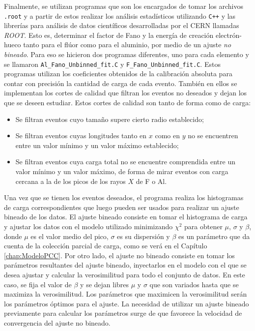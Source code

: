 Finalmente, se utilizan programas que son los encargados de tomar los archivos \verb|.root| y a partir de estos realizar los análisis estadísticos utilizando \verb|C++| y las librerías para análisis de datos científicos desarrolladas por el CERN llamadas \textit{ROOT}. Esto es, determinar el factor de Fano y la energía de creación electrón-hueco tanto para el flúor como para el aluminio, por medio de un ajuste \textit{no bineado}. Para eso se hicieron dos programas diferentes, uno para cada elemento y se llamaron \verb|Al_Fano_Unbinned_fit.C| y \verb|F_Fano_Unbinned_fit.C|. Estos programas utilizan los coeficientes obtenidos de la calibración absoluta para contar con precisión la cantidad de carga de cada evento. También en ellos se implementan los cortes de calidad que filtran los eventos no deseados y dejan los que se deseen estudiar. Estos cortes de calidad son tanto de forma como de carga: 
\begin{itemize}
    \item Se filtran eventos cuyo tamaño supere cierto radio establecido;
    \item Se filtran eventos cuyas longitudes tanto en $x$ como en $y$ no se encuentren entre un valor mínimo y un valor máximo establecido;
    \item Se filtran eventos cuya carga total no se encuentre comprendida entre un valor mínimo y un valor máximo, de forma de mirar eventos con carga cercana a la de los picos de los rayos $X$ de F o Al.
\end{itemize}
Una vez que se tienen los eventos deseados, el programa realiza los histogramas de carga correspondientes que luego pueden ser usados para realizar un ajuste bineado de los datos. El ajuste bineado consiste en tomar el histograma de carga y ajustar los datos con el modelo utilizado minimizando $\chi^{2}$ para obtener $\mu$, $\sigma$ y $\beta$, donde $\mu$ es el valor medio del pico, $\sigma$ es su dispersión y $\beta$ es un parámetro que da cuenta de la colección parcial de carga, como se verá en el Capítulo \ref{chap:ModeloPCC}. Por otro lado, el ajuste no bineado consiste en tomar los parámetros resultantes del ajuste bineado, inyectarlos en el modelo con el que se desea ajustar y calcular la verosimilitud para todo el conjunto de datos. En este caso, se fija el valor de $\beta$ y se dejan libres $\mu$ y $\sigma$ que son variados hasta que se maximiza la verosimilitud. Los parámetros que maximicen la verosimilitud serán los parámetros óptimos para el ajuste. La necesidad de utilizar un ajuste bineado previamente para calcular los parámetros surge de que favorece la velocidad de convergencia del ajuste no bineado.

